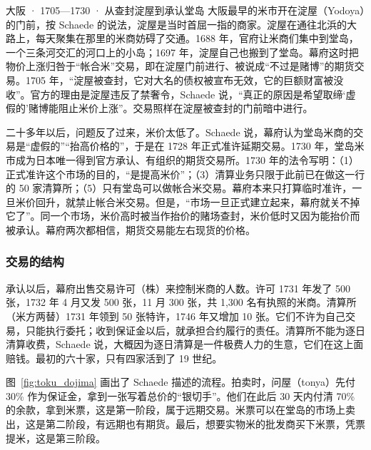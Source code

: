\begin{case}{大阪 · 1705—1730 · 从查封淀屋到承认堂岛}
大阪最早的米市开在淀屋（Yodoya）的门前，按 Schaede 的说法，淀屋是当时首屈一指的商家。淀屋在通往北浜的大路上，每天聚集在那里的米商妨碍了交通。1688 年，官府让米商们集中到堂岛，一个三条河交汇的河口上的小岛；1697 年，淀屋自己也搬到了堂岛\cite{schaede1989}。幕府这时把物价上涨归咎于“帐合米”交易，即在淀屋门前进行、被说成“不过是赌博”的期货交易。1705 年，“淀屋被查封，它对大名的债权被宣布无效，它的巨额财富被没收”。官方的理由是淀屋违反了禁奢令，Schaede 说，“真正的原因是希望取缔‘虚假的’赌博能阻止米价上涨”\cite{schaede1989}。交易照样在淀屋被查封的门前暗中进行。

二十多年以后，问题反了过来，米价太低了。Schaede 说，幕府认为堂岛米商的交易是“虚假的”“抬高价格的”，于是在 1728 年正式准许延期交易。1730 年，堂岛米市成为日本唯一得到官方承认、有组织的期货交易所\cite{schaede1989}。1730 年的法令写明：（1）正式准许这个市场的目的，“是提高米价”；（3）清算业务只限于此前已在做这一行的 50 家清算所；（5）只有堂岛可以做帐合米交易\cite{schaede1989}。幕府本来只打算临时准许，一旦米价回升，就禁止帐合米交易。但是，“市场一旦正式建立起来，幕府就关不掉它了”\cite{schaede1989}。同一个市场，米价高时被当作抬价的赌场查封，米价低时又因为能抬价而被承认。幕府两次都相信，期货交易能左右现货的价格。
\end{case}

\subsubsection{交易的结构}
承认以后，幕府出售交易许可（株）来控制米商的人数。许可 1731 年发了 500 张，1732 年 4 月又发 500 张，11 月 300 张\cite{schaede1989}，共 1,300 名有执照的米商。清算所（米方两替）1731 年领到 50 张特许，1746 年又增加 10 张。它们不许为自己交易，只能执行委托；收到保证金以后，就承担合约履行的责任\cite{schaede1989}。清算所不能为逐日清算收费，Schaede 说，大概因为逐日清算是一件极费人力的生意，它们在这上面赔钱。最初的六十家，只有四家活到了 19 世纪\cite{schaede1989}。

图~\ref{fig:toku_dojima} 画出了 Schaede 描述的流程。拍卖时，问屋（tonya）先付 30\% 作为保证金，拿到一张写着总价的“银切手”。他们在此后 30 天内付清 70\% 的余款，拿到米票，这是第一阶段，属于远期交易\cite{schaede1989}。米票可以在堂岛的市场上卖出，这是第二阶段，有远期也有期货。最后，想要实物米的批发商买下米票，凭票提米，这是第三阶段。


